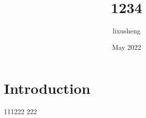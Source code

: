 \documentclass{article}
\title{1234}
\author{lixusheng }
\date{May 2022}
\begin{document}
\maketitle

\section{Introduction}
111222
222
\end{document}
